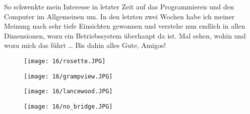 So schwenkte mein Interesse in letzter Zeit auf das Programmieren und
den Computer im Allgemeinen um. In den letzten zwei Wochen habe ich
meiner Meinung nach sehr tiefe Einsichten gewonnen und verstehe nun
endlich in allen Dimensionen, wozu ein Betriebssystem überhaupt da
ist.  Mal sehen, wohin und wozu mich das führt \ldots{} Bis dahin
alles Gute, Amigos!

\begin{figure}[p]
  \centering
  \texttt{[image: 16/rosette.JPG]}
\end{figure}
\begin{figure}[p]
  \centering
  \texttt{[image: 16/grampview.JPG]}
\end{figure}
\begin{figure}[p]
  \centering
  \texttt{[image: 16/lancewood.JPG]}
\end{figure}
\begin{figure}[p]
  \centering
  \texttt{[image: 16/no\_bridge.JPG]}
\end{figure}
